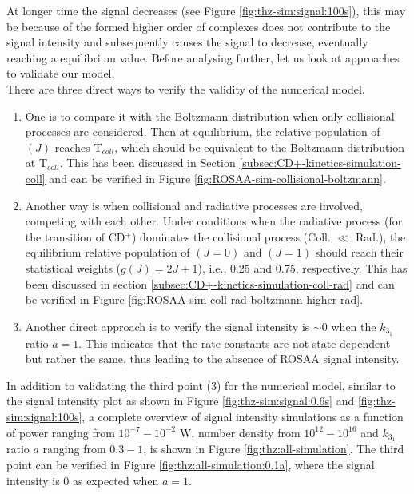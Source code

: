 At longer time the signal decreases (see Figure \ref{fig:thz-sim:signal:100s}),
this may be because of the formed higher order of complexes 
does not contribute to the signal intensity and subsequently causes the signal to decrease, 
eventually reaching a equilibrium value. 
Before analysing further, let us look at approaches to validate our model.\\


There are three direct ways to verify the validity of the numerical model.

\begin{enumerate}
    \item  One is to compare it with the Boltzmann distribution when only collisional
          processes are considered. Then at equilibrium, the relative population of
          \CD$(J)$ reaches T$_{coll}$, which should be equivalent to the
          Boltzmann distribution at T$_{coll}$. This has been discussed in Section
          \ref{subsec:CD+-kinetics-simulation-coll} and can be verified in Figure
          \ref{fig:ROSAA-sim-collisional-boltzmann}.
    \item Another way is when collisional and radiative processes are involved,
          competing with each other. Under conditions when the radiative process (for
          the \CDline transition of CD$^+$) dominates the collisional process (Coll. $\ll$
          Rad.), the equilibrium relative population of \CD$(J=0)$ and \CD$(J=1)$ should
          reach their statistical weights ($g(J) = 2J+1$), i.e., 0.25 and 0.75,
          respectively. This has been discussed in section
          \ref{subsec:CD+-kinetics-simulation-coll-rad} and can be verified in Figure
          \ref{fig:ROSAA-sim-coll-rad-boltzmann-higher-rad}.
    \item Another direct approach is to verify the signal intensity is $\sim 0$ when
          the $k_{3_1}$ ratio $a=1$. This indicates that the rate constants are not
          state-dependent but rather the same, thus leading to the absence of ROSAA
          signal intensity.
\end{enumerate}

In addition to validating the third point (3) for the numerical model, similar
to the signal intensity plot as shown in Figure \ref{fig:thz-sim:signal:0.6s}
and \ref{fig:thz-sim:signal:100s}, a complete overview of signal intensity
simulations as a function of power ranging from $10^{-7}-10^{-2}$ W, number
density from $10^{12}-10^{16}$ \percc and $k_{3_1}$ ratio $a$ ranging from
$0.3-1$, is shown in Figure \ref{fig:thz:all-simulation}. The third point can
be verified in Figure \ref{fig:thz:all-simulation:0.1a}, where the
signal intensity is 0 as expected when $a=1$.\\

